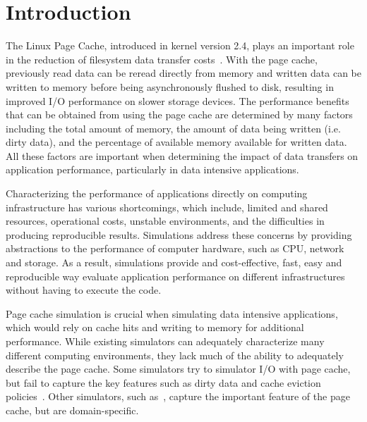 \documentclass[conference]{IEEEtran}
\begin{document}
	\section{Introduction}
		
        The Linux Page Cache, introduced in kernel version 2.4, plays an important role in
        the reduction of filesystem data transfer costs~\cite{pagecache}. With the page cache, previously
        read data can be reread directly from memory and written data can be written to
        memory before being asynchronously flushed to disk, resulting in improved I/O performance
        on slower storage devices. The performance benefits that can be obtained from using the page
        cache are determined by many factors including the total amount of memory,
        the amount of data being written (i.e. dirty data), and the percentage of available memory available for
        written data. All these factors are important when determining the impact of data transfers on
        application performance, particularly in data intensive applications.

        Characterizing the performance of applications directly on computing infrastructure
        has various shortcomings, which include, limited and shared resources, operational
        costs, unstable environments, and the difficulties in producing reproducible results.
        Simulations address these concerns by providing abstractions to the performance of computer
        hardware, such as CPU, network and storage. As a result, simulations provide and
        cost-effective, fast, easy and reproducible  way evaluate application performance
        on different infrastructures without having to execute the code.


        Page cache simulation is crucial when simulating data intensive applications,
        which would rely on cache hits and writing to memory for additional performance.
        While existing simulators can adequately characterize many different computing environments,
        they lack much of the ability to adequately describe the page cache. Some
        simulators try to simulator I/O with page cache, but fail to capture the key features such
        as dirty data and cache eviction policies~\cite{nunez2012simcan,nunez2012icancloud}. 
        Other simulators, such as~\cite{xu2018}, capture the important feature of the
        page cache, but are domain-specific. 

\end{document}
